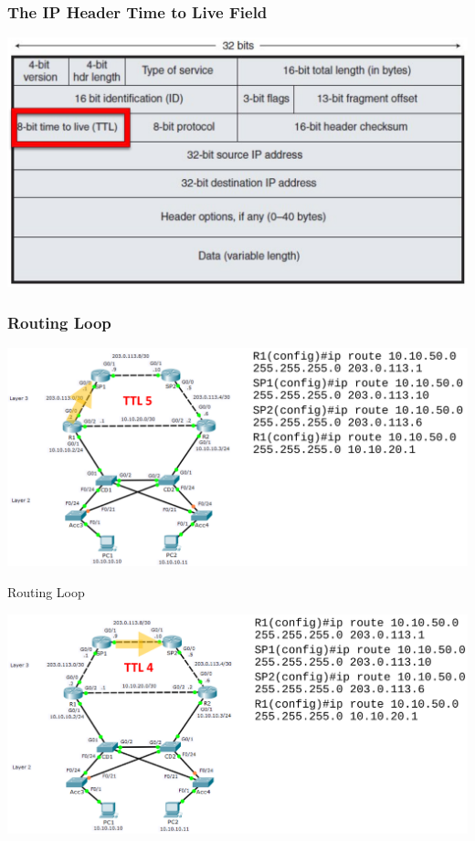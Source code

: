 \documentclass[pdflatex,compress,mathserif]{beamer}
\begin{document}
\begin{frame}
	\frametitle{The IP Header Time to Live Field}
	\begin{center}
		\includegraphics[width=\linewidth]{img/img16}
	\end{center}
\end{frame}

\begin{frame}
	\frametitle{Routing Loop}
	\begin{center}
		\includegraphics[width=\linewidth]{img/img17}
	\end{center}
\end{frame}

\begin{frame}{Routing Loop}
	\begin{center}
		\includegraphics[width=\linewidth]{img/img18}
	\end{center}
\end{frame}
\end{document}
